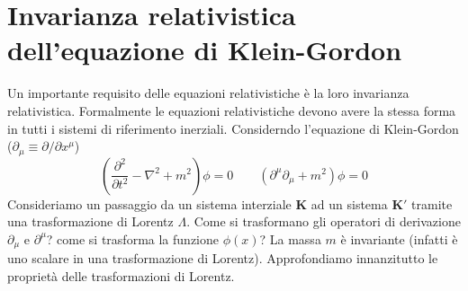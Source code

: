 \section{Invarianza relativistica dell'equazione di Klein-Gordon}
Un importante requisito delle equazioni relativistiche è la loro invarianza relativistica. Formalmente le equazioni relativistiche devono avere la stessa forma in tutti i sistemi di riferimento inerziali. Considerndo l'equazione di Klein-Gordon ($\partial_\mu\equiv\partial/\partial x^\mu$)
\begin{equation}
    \left(\frac{\partial^2}{\partial t^2} - \nabla^2 + m^2\right)\phi = 0 \qquad \left(\partial^\mu\partial_\mu+m^2\right)\phi=0
\end{equation}
Consideriamo un passaggio da un sistema interziale $\mathbf{K}$ ad un sistema $\mathbf{K}'$ tramite una trasformazione di Lorentz $\Lambda$. Come si trasformano gli operatori di derivazione $\partial_\mu$ e $\partial^\mu$? come si trasforma la funzione $\phi(x)$? La massa $m$ è invariante (infatti è uno scalare in una trasformazione di Lorentz). Approfondiamo innanzitutto le proprietà delle trasformazioni di Lorentz.
